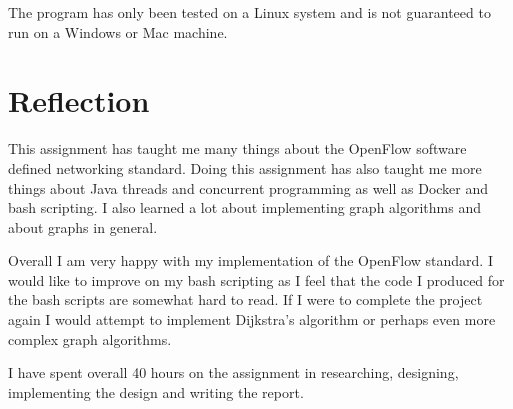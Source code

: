 \documentclass{article}
\begin{document}
The program has only been tested on a Linux system and is not guaranteed to run
on a Windows or Mac machine.

\section{Reflection}
This assignment has taught me many things about the OpenFlow software defined
networking standard. Doing this assignment has also taught me more things about
Java threads and concurrent programming as well as Docker and bash scripting. I
also learned a lot about implementing graph algorithms and about graphs in
general.

Overall I am very happy with my implementation of the OpenFlow standard. I would
like to improve on my bash scripting as I feel that the code I produced for the
bash scripts are somewhat hard to read. If I were to complete the project again
I would attempt to implement Dijkstra's algorithm or perhaps even more complex
graph algorithms.

I have spent overall 40 hours on the assignment in researching, designing,
implementing the design and writing the report.
\end{document}
